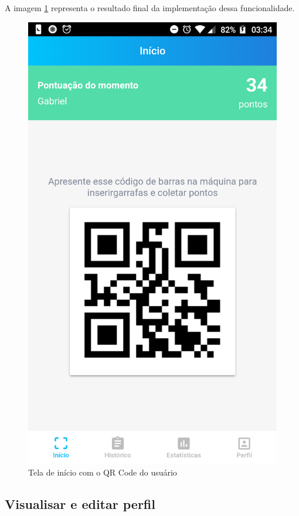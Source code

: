 A imagem \ref{fig:qrcode} representa o resultado final da implementação dessa funcionalidade.

\begin{figure}[!ht]
	\centering
		\includegraphics[scale=0.2]{figuras/software/qr_code.png}
	\caption{Tela de início com o QR Code do usuário}
	\label{fig:qrcode}
\end{figure}

\subsection{Visualisar e editar perfil}

